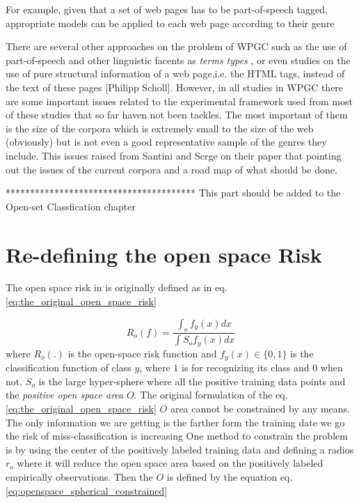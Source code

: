  For example, given that a set of web pages has to be part-of-speech tagged, appropriate models can be applied to each web page according to their genre \parencite{Nooralahzadeh2014}

There are several other approaches on the problem of WPGC such as the use of part-of-speech and other linguistic facents as \textit{terms types} \parencite{feldman2009classifying,santini2005linguistic}, or even studies on the use of pure structural information of a web page,i.e. the HTML tags, instead of the text of these pages {[}Philipp Scholl{]}. However, in all studies in WPGC there are some important issues related to the experimental framework used from most of these studies that so far haven not been tackles. The most important of them is the size of the corpora which is extremely small to the size of the web (obviously) but is not even a good representative sample of the genres they include. This issues raised from Santini and Serge \parencite{santini2009web} on their paper that pointing out the issues of the current corpora and a road map of what should be done. 


***************************************
This part should be added to the Open-set Classfication chapter

\section{Re-defining the open space Risk }

The open space risk in \cite{scheirer2013toward} is originally defined as in eq. \ref{eq:the_original_open_space_risk}

\begin{equation}\label{eq:the_origina_open_space_risk}
	R_{o}(f) = \frac{\int_{o} f_{y}(x) dx}{\int{S_{o}}  f_{y}(x) dx}
\end{equation}
where $R_{o}(.)$ is the open-space risk function and $f_{y}(x)  \in \{0, 1\}$ is the classification function of class $y$, where $1$ is for recognizing its class and $0$ when not. $S_{o}$ is the large hyper-sphere where all the positive training data points and the \textit{positive open space area} $O$. 
The original formulation of the eq. \ref{eq:the_original_open_space_risk} $O$ area cannot be constrained by any means. The only information we are getting is the farther form the training date we go the risk of miss-classification is increasing One method to constrain the problem is by using the center of the positively labeled training data and defining a radios $r_{o}$ where it will reduce the open space area based on the positively labeled empirically observations. Then the $O$ is defined by the equation eq. \ref{eq:openspace_spherical_constrained}

